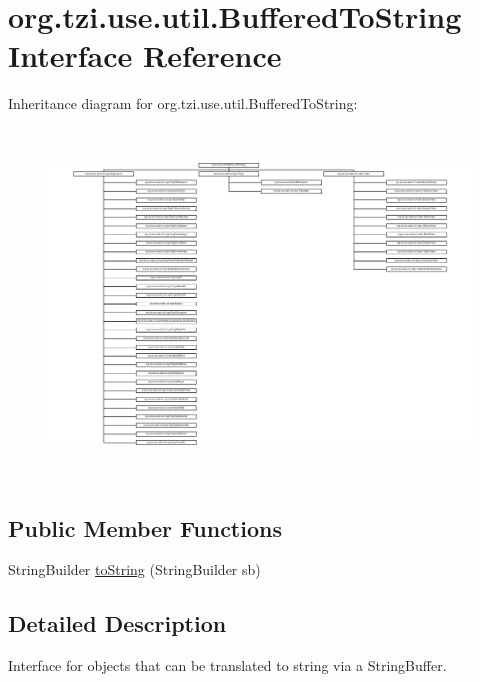 \hypertarget{interfaceorg_1_1tzi_1_1use_1_1util_1_1_buffered_to_string}{\section{org.\-tzi.\-use.\-util.\-Buffered\-To\-String Interface Reference}
\label{interfaceorg_1_1tzi_1_1use_1_1util_1_1_buffered_to_string}
}
Inheritance diagram for org.\-tzi.\-use.\-util.\-Buffered\-To\-String\-:\begin{figure}[H]
\begin{center}
\leavevmode
\includegraphics[height=9.305136cm]{interfaceorg_1_1tzi_1_1use_1_1util_1_1_buffered_to_string}
\end{center}
\end{figure}
\subsection*{Public Member Functions}
\begin{DoxyCompactItemize}
\item 
String\-Builder \hyperlink{interfaceorg_1_1tzi_1_1use_1_1util_1_1_buffered_to_string_aea95e4e53b18818d50ee253700e6e2d5}{to\-String} (String\-Builder sb)
\end{DoxyCompactItemize}


\subsection{Detailed Description}
Interface for objects that can be translated to string via a String\-Buffer.

